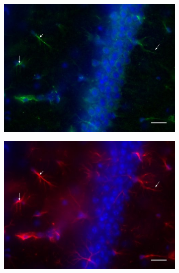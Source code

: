 	\begin{figure}[h]
		\begin{center}
			\begin{subfigure}[h]{0.49\textwidth}
				\caption{}
				\label{fig:ColocMuSK}
				\includegraphics[width=\textwidth]{./Images/Immuno/Musk/MuSK-GFAP/M439_Mut_MuSK.jpg}
			\end{subfigure}
			\begin{subfigure}[h]{0.49\textwidth}
				\caption{}
				\label{fig:ColocGFAP}
				\includegraphics[width=\textwidth]{./Images/Immuno/Musk/MuSK-GFAP/M439_Mut_GFAP.jpg}
			\end{subfigure}
			\begin{subfigure}[h]{0.49\textwidth}

\end{subfigure}
\end{center}
\end{figure}
